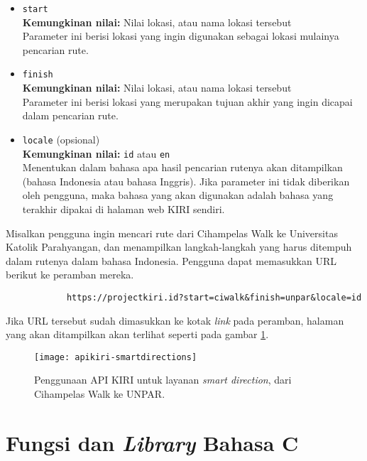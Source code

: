 \begin{itemize}
	\item \verb|start|\\
	\textbf{Kemungkinan nilai:} Nilai \latlon lokasi, atau nama lokasi tersebut\\
	Parameter ini berisi lokasi yang ingin digunakan sebagai lokasi mulainya pencarian rute.
	\item \verb|finish|\\
	\textbf{Kemungkinan nilai:} Nilai \latlon lokasi, atau nama lokasi tersebut\\
	Parameter ini berisi lokasi yang merupakan tujuan akhir yang ingin dicapai dalam pencarian rute.
	\item \verb|locale| (opsional)\\
	\textbf{Kemungkinan nilai:} \verb|id| atau \verb|en|\\
	Menentukan dalam bahasa apa hasil pencarian rutenya akan ditampilkan (bahasa Indonesia atau bahasa Inggris). Jika parameter ini tidak diberikan oleh pengguna, maka bahasa yang akan digunakan adalah bahasa yang terakhir dipakai di halaman web KIRI sendiri.
\end{itemize}
\vspace{\baselineskip}\noindent
Misalkan pengguna ingin mencari rute dari Cihampelas Walk ke Universitas Katolik Parahyangan, dan menampilkan langkah-langkah yang harus ditempuh dalam rutenya dalam bahasa Indonesia. Pengguna dapat memasukkan URL berikut ke peramban mereka.

\begin{verbatim}
            https://projectkiri.id?start=ciwalk&finish=unpar&locale=id
\end{verbatim}
\noindent
Jika URL tersebut sudah dimasukkan ke kotak \textit{link} pada peramban, halaman yang akan ditampilkan akan terlihat seperti pada gambar \ref{fig:kiri-api-smartdirections-usage}.

\begin{figure}[ht]
    \centering
    \texttt{[image: apikiri-smartdirections]}
    \caption[Penggunaan API KIRI untuk layanan \textit{smart direction}]{Penggunaan API KIRI untuk layanan \textit{smart direction}, dari Cihampelas Walk ke UNPAR.}
    \label{fig:kiri-api-smartdirections-usage}
\end{figure}

\section{Fungsi dan \textit{Library} Bahasa C}
\label{sec:cmodules}

